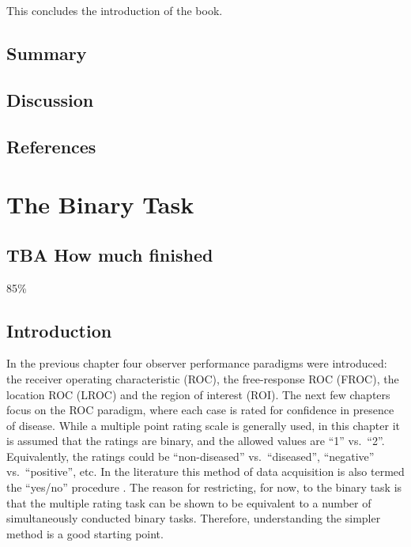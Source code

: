 \documentclass[
]{book}
\begin{document}
This concludes the introduction of the book.

\hypertarget{preliminaries-Summary}{%
\section{Summary}\label{preliminaries-Summary}}

\hypertarget{preliminaries-Discussion}{%
\section{Discussion}\label{preliminaries-Discussion}}

\hypertarget{preliminaries-references}{%
\section{References}\label{preliminaries-references}}

\hypertarget{binary-task}{%
\chapter{The Binary Task}\label{binary-task}}

\hypertarget{binary-task-how-much-finished}{%
\section{TBA How much finished}\label{binary-task-how-much-finished}}

85\%

\hypertarget{binary-taskIntro}{%
\section{Introduction}\label{binary-taskIntro}}

In the previous chapter four observer performance paradigms were introduced: the receiver operating characteristic (ROC), the free-response ROC (FROC), the location ROC (LROC) and the region of interest (ROI). The next few chapters focus on the ROC paradigm, where each case is rated for confidence in presence of disease. While a multiple point rating scale is generally used, in this chapter it is assumed that the ratings are binary, and the allowed values are ``1'' vs.~``2''. Equivalently, the ratings could be ``non-diseased'' vs.~``diseased'', ``negative'' vs.~``positive'', etc. In the literature this method of data acquisition is also termed the ``yes/no'' procedure \citep{green1966signal, egan1975book}. The reason for restricting, for now, to the binary task is that the multiple rating task can be shown to be equivalent to a number of simultaneously conducted binary tasks. Therefore, understanding the simpler method is a good starting point.
\end{document}
